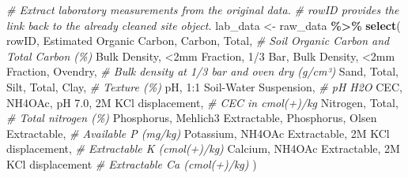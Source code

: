 \documentclass[
  10pt,
  b5paper,
  oneside]{book}
\newenvironment{Shaded}{\begin{snugshade}}{\end{snugshade}}
\newcommand{\AttributeTok}[1]{\textcolor[rgb]{0.13,0.29,0.53}{#1}}
\newcommand{\CommentTok}[1]{\textcolor[rgb]{0.56,0.35,0.01}{\textit{#1}}}
\newcommand{\FunctionTok}[1]{\textcolor[rgb]{0.13,0.29,0.53}{\textbf{#1}}}
\newcommand{\NormalTok}[1]{#1}
\newcommand{\OtherTok}[1]{\textcolor[rgb]{0.56,0.35,0.01}{#1}}
\newcommand{\SpecialCharTok}[1]{\textcolor[rgb]{0.81,0.36,0.00}{\textbf{#1}}}
\newcommand{\StringTok}[1]{\textcolor[rgb]{0.31,0.60,0.02}{#1}}
\begin{document}
\begin{Shaded}
\begin{Highlighting}[]
\CommentTok{\# Extract laboratory measurements from the original data.}
\CommentTok{\# rowID provides the link back to the already cleaned site object.}
\NormalTok{lab\_data }\OtherTok{\textless{}{-}}\NormalTok{ raw\_data }\SpecialCharTok{\%\textgreater{}\%}
  \FunctionTok{select}\NormalTok{(}
\NormalTok{    rowID,}
    \StringTok{\textasciigrave{}}\AttributeTok{Estimated Organic Carbon}\StringTok{\textasciigrave{}}\NormalTok{, }\StringTok{\textasciigrave{}}\AttributeTok{Carbon, Total}\StringTok{\textasciigrave{}}\NormalTok{,                                     }\CommentTok{\# Soil Organic Carbon and Total Carbon (\%)}
    \StringTok{\textasciigrave{}}\AttributeTok{Bulk Density, \textless{}2mm Fraction, 1/3 Bar}\StringTok{\textasciigrave{}}\NormalTok{, }\StringTok{\textasciigrave{}}\AttributeTok{Bulk Density, \textless{}2mm Fraction, Ovendry}\StringTok{\textasciigrave{}}\NormalTok{,  }\CommentTok{\# Bulk density at 1/3 bar and oven dry (g/cm³)}
    \StringTok{\textasciigrave{}}\AttributeTok{Sand, Total}\StringTok{\textasciigrave{}}\NormalTok{, }\StringTok{\textasciigrave{}}\AttributeTok{Silt, Total}\StringTok{\textasciigrave{}}\NormalTok{, }\StringTok{\textasciigrave{}}\AttributeTok{Clay}\StringTok{\textasciigrave{}}\NormalTok{,                                            }\CommentTok{\# Texture (\%)}
    \StringTok{\textasciigrave{}}\AttributeTok{pH, 1:1 Soil{-}Water Suspension}\StringTok{\textasciigrave{}}\NormalTok{,                                                 }\CommentTok{\# pH H2O}
    \StringTok{\textasciigrave{}}\AttributeTok{CEC, NH4OAc, pH 7.0, 2M KCl displacement}\StringTok{\textasciigrave{}}\NormalTok{,                                      }\CommentTok{\# CEC in cmol(+)/kg}
    \StringTok{\textasciigrave{}}\AttributeTok{Nitrogen, Total}\StringTok{\textasciigrave{}}\NormalTok{,                                                               }\CommentTok{\# Total nitrogen (\%)}
    \StringTok{\textasciigrave{}}\AttributeTok{Phosphorus, Mehlich3 Extractable}\StringTok{\textasciigrave{}}\NormalTok{, }\StringTok{\textasciigrave{}}\AttributeTok{Phosphorus, Olsen Extractable}\StringTok{\textasciigrave{}}\NormalTok{,             }\CommentTok{\# Available P (mg/kg)}
    \StringTok{\textasciigrave{}}\AttributeTok{Potassium, NH4OAc Extractable, 2M KCl displacement}\StringTok{\textasciigrave{}}\NormalTok{,                            }\CommentTok{\# Extractable K (cmol(+)/kg)}
    \StringTok{\textasciigrave{}}\AttributeTok{Calcium, NH4OAc Extractable, 2M KCl displacement}\StringTok{\textasciigrave{}}                               \CommentTok{\# Extractable Ca (cmol(+)/kg)}
\NormalTok{  )}


\end{Highlighting}
\end{Shaded}
\end{document}

